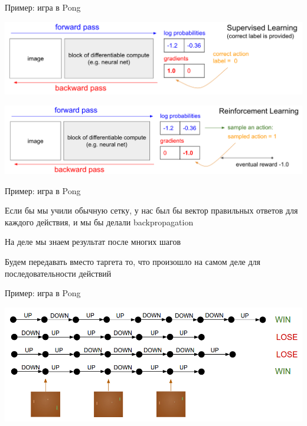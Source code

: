 \documentclass[notes,12pt, aspectratio=169]{beamer}
\newenvironment{wideitemize}{\itemize\addtolength{\itemsep}{10pt}}{\enditemize}
\begin{document}
\begin{frame}{Пример: игра в Pong}
\begin{center}
	\includegraphics[width=.8\linewidth]{pong_label.png}
\end{center}
\vfill \pause 
\begin{center}
	\includegraphics[width=.8\linewidth]{pong_sample.png}
\end{center}
\end{frame}


\begin{frame}{Пример: игра в Pong}
\begin{wideitemize}
	\item   Если бы мы учили обычную сетку, у нас был бы вектор правильных ответов для каждого действия, и мы бы делали backpropagation 
	
	\item  На деле мы знаем результат после многих шагов
	
	\item  Будем передавать вместо таргета то, что произошло на самом деле для последовательности действий 
\end{wideitemize}
\end{frame}


\begin{frame}{Пример: игра в Pong}
\begin{center}
	\includegraphics[width=.8\linewidth]{pong_backprop.png}
\end{center}
\end{frame}
\end{document}
